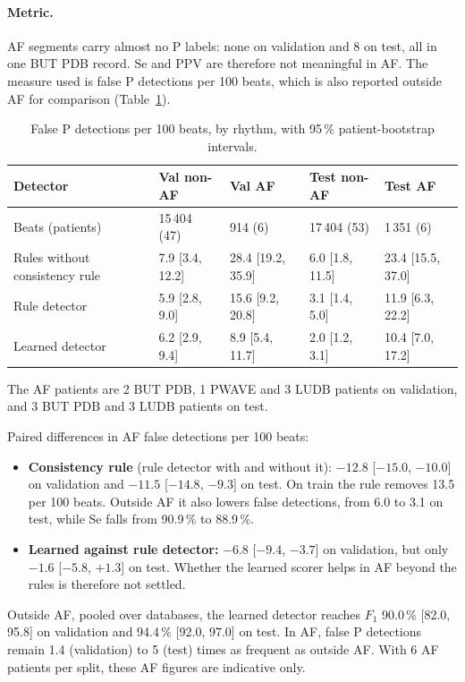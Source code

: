 \documentclass[11pt,a4paper]{article}
\begin{document}
\paragraph{Metric.} AF segments carry almost no P labels: none on validation and 8 on test, all in one BUT PDB record. Se and PPV are therefore not meaningful in AF. The measure used is false P detections per 100 beats, which is also reported outside AF for comparison (Table~\ref{tab:rhythm}).

\begin{table}[htbp]
\centering\small
\caption{False P detections per 100 beats, by rhythm, with 95\,\% patient-bootstrap intervals.}
\label{tab:rhythm}
\begin{tabular}{lllll}
\toprule
Detector & Val non-AF & Val AF & Test non-AF & Test AF \\
\midrule
Beats (patients) & 15\,404 (47) & 914 (6) & 17\,404 (53) & 1\,351 (6) \\
\midrule
Rules without consistency rule & 7.9 [3.4, 12.2] & 28.4 [19.2, 35.9] & 6.0 [1.8, 11.5] & 23.4 [15.5, 37.0] \\
Rule detector & 5.9 [2.8, 9.0] & 15.6 [9.2, 20.8] & 3.1 [1.4, 5.0] & 11.9 [6.3, 22.2] \\
Learned detector & 6.2 [2.9, 9.4] & 8.9 [5.4, 11.7] & 2.0 [1.2, 3.1] & 10.4 [7.0, 17.2] \\
\bottomrule
\end{tabular}
\end{table}

The AF patients are 2 BUT PDB, 1 PWAVE and 3 LUDB patients on validation, and 3 BUT PDB and 3 LUDB patients on test.

Paired differences in AF false detections per 100 beats:
\begin{itemize}
\item \textbf{Consistency rule} (rule detector with and without it): $-12.8$ [$-15.0$, $-10.0$] on validation and $-11.5$ [$-14.8$, $-9.3$] on test. On train the rule removes 13.5 per 100 beats. Outside AF it also lowers false detections, from 6.0 to 3.1 on test, while Se falls from 90.9\,\% to 88.9\,\%.
\item \textbf{Learned against rule detector:} $-6.8$ [$-9.4$, $-3.7$] on validation, but only $-1.6$ [$-5.8$, $+1.3$] on test. Whether the learned scorer helps in AF beyond the rules is therefore not settled.
\end{itemize}
Outside AF, pooled over databases, the learned detector reaches $F_1$ 90.0\,\% [82.0, 95.8] on validation and 94.4\,\% [92.0, 97.0] on test. In AF, false P detections remain 1.4 (validation) to 5 (test) times as frequent as outside AF. With 6 AF patients per split, these AF figures are indicative only.
\end{document}
